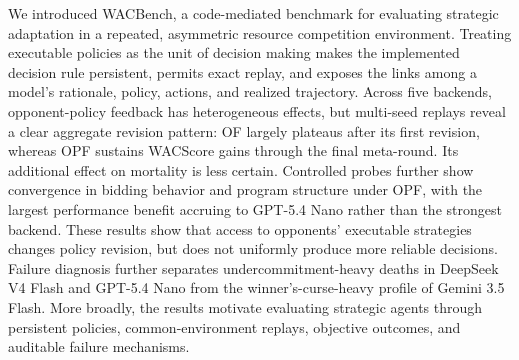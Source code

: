 \documentclass[letterpaper]{article} %
\begin{document}
We introduced WACBench, a code-mediated benchmark for evaluating strategic
adaptation in a repeated, asymmetric resource competition environment.
Treating executable policies as the unit of decision making makes the
implemented decision rule persistent, permits exact replay, and exposes the
links among a model's rationale, policy, actions, and realized trajectory.
Across five backends, opponent-policy feedback has heterogeneous effects, but
multi-seed replays reveal a clear aggregate revision pattern: OF largely
plateaus after its first revision, whereas OPF sustains WACScore gains through
the final meta-round. Its additional effect on mortality is less certain.
Controlled probes further show convergence in bidding behavior and program
structure under OPF, with the largest performance benefit accruing to
GPT-5.4 Nano rather than the strongest backend. These results show that
access to opponents' executable strategies changes policy revision, but does
not uniformly produce more reliable decisions. Failure diagnosis further
separates undercommitment-heavy deaths in DeepSeek V4 Flash and GPT-5.4 Nano
from the winner's-curse-heavy profile of Gemini 3.5 Flash. More broadly, the
results motivate
evaluating strategic agents through persistent policies, common-environment
replays, objective outcomes, and auditable failure mechanisms.


\end{document}
